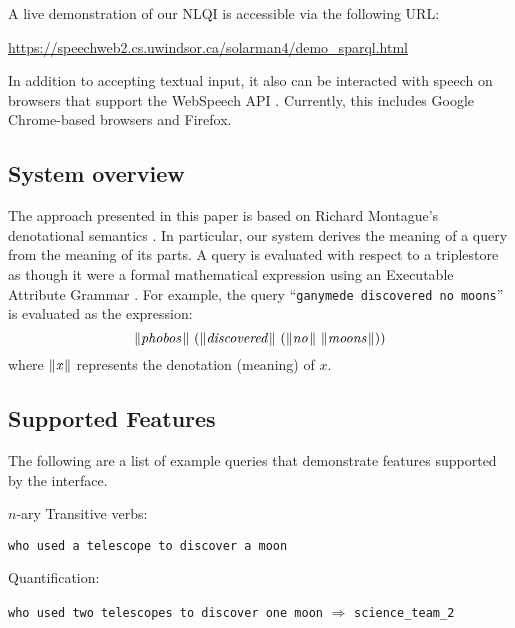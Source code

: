\documentclass[../main.tex]{subfiles}
\begin{document}
\begin{refsection}
\noindent A live demonstration of our NLQI is accessible via the following URL:
\begin{center}
	\url{https://speechweb2.cs.uwindsor.ca/solarman4/demo_sparql.html}
\end{center}
In addition to accepting textual input, it also can be interacted with speech on browsers that support the WebSpeech API \cite{world2018web}.  Currently, this includes Google Chrome-based browsers and Firefox.

\subsection{System overview}

The approach presented in this paper is based on Richard Montague's denotational semantics \cite{Dowty:wall}.  In particular, our system derives the meaning of a query from the meaning of its parts.  A query is evaluated with respect to a triplestore as though it were a formal mathematical expression using an Executable Attribute Grammar \cite{hafiz2011executable}.  For example, the query
``\texttt{ganymede discovered no moons}'' is evaluated as the expression:
\begin{equation*}
    \meaningof{phobos}\ (\meaningof{discovered}\ (\meaningof{no}\ \meaningof{moons}))
\end{equation*}
where $\lVert\textit{x\hspace{0.1em}}\rVert$ represents the denotation (meaning) of $x$.

\subsection{Supported Features}

The following are a list of example queries that demonstrate features supported by the interface.

\newcommand{\examplespacing}{\vspace{0.5em}}

\examplespacing

\noindent $n$-ary Transitive verbs:

\examplespacing

\texttt{who used a telescope to discover a moon}

\examplespacing

\noindent Quantification:

\examplespacing

\texttt{who used two telescopes to discover one moon} $\Rightarrow$ \texttt{science\_team\_2}


\end{refsection}
\end{document}
